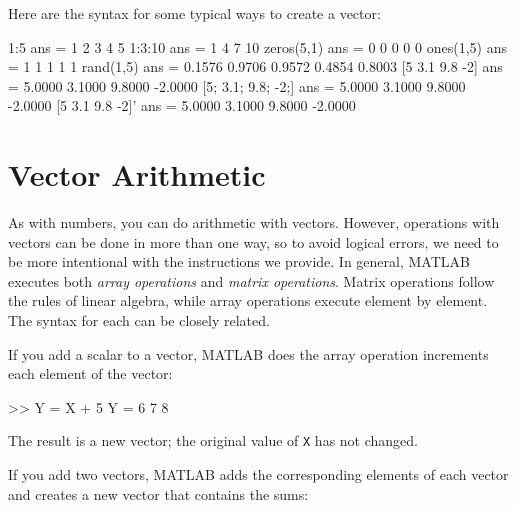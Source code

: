 Here are the syntax for some typical ways to create a vector:
\begin{code}
     1:5
     ans =
          1     2     3     4     5
     1:3:10
     ans =
          1     4     7    10
     zeros(5,1)
     ans =
          0
          0
          0
          0
          0
     ones(1,5)
     ans =
          1     1     1     1     1
     rand(1,5)
     ans =
         0.1576    0.9706    0.9572    0.4854    0.8003
     [5 3.1 9.8 -2]
     ans =
         5.0000    3.1000    9.8000   -2.0000
     [5; 3.1; 9.8; -2;]
     ans =
         5.0000
         3.1000
         9.8000
        -2.0000
     [5 3.1 9.8 -2]'
     ans =
         5.0000
         3.1000
         9.8000
        -2.0000
\end{code}


\section{Vector Arithmetic}
\label{elementwise}


As with numbers, you can do arithmetic with vectors.  However, operations with vectors can be done in more than one way, so to avoid logical errors, we need to be more intentional with the instructions we provide.  In general, MATLAB executes both \emph{array operations} and \emph{matrix operations}.   Matrix operations follow the rules of linear algebra, while array operations execute element by element.  The syntax for each can be closely related.


If you add a scalar to a vector, MATLAB does the array operation increments each element of the vector:

\begin{code}
>> Y = X + 5
Y = 6     7     8
\end{code}

The result is a new vector; the original value of \lstinline{X} has not
changed.

If you add two vectors, MATLAB adds the corresponding elements of each
vector and creates a new vector that contains the sums:

